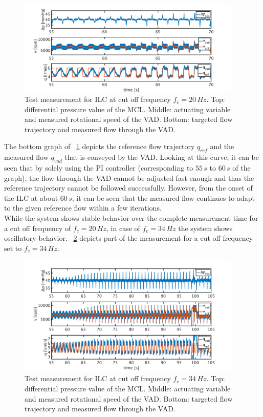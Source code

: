 \begin{figure}[ht]
  \centering
  \includegraphics[width=0.95\textwidth]{images/chapt_5/ILC/pi_to_ilc_fc_20.pdf}
  \caption[Test measurement for ILC at cut off frequency $f_c=20\,Hz$]{Test measurement for ILC at cut off frequency $f_c=20\,Hz$.  Top: differential pressure value of the MCL. Middle: actuating variable and measured rotational speed of the VAD. Bottom: targeted flow trajectory and measured flow through the VAD.}
  \label{fig:pi_to_ilc}
\end{figure}
The bottom graph of \figurename~\ref{fig:pi_to_ilc} depicts the reference flow trajectory $q_{ref}$ and the measured flow $q_{vad}$ that is conveyed by the VAD. Looking at this curve, it can be seen that by solely using the PI controller (corresponding to $55\,s$ to $60\,s$ of the graph), the flow through the VAD cannot be adjusted fast enough and thus the reference trajectory cannot be followed successfully. However, from the onset of the ILC at about $60\,s$, it can be seen that the measured flow continues to adapt to the given reference flow within a few iterations.
\\While the system shows stable behavior over the complete measurement time for a cut off frequency of $f_c=20\,Hz$, in case of $f_c=34\,Hz$ the system shows oscillatory behavior. \figurename~\ref{fig:pi_to_ilc_fc_34} depicts part of the measurement for a cut off frequency set to $f_c=34\,Hz$.
\begin{figure}[ht]
  \centering
  \includegraphics[width=0.95\textwidth]{images/chapt_5/ILC/pi_to_ilc_fc_34.pdf}
  \caption[Test measurement for ILC at cut off frequency $f_c=34\,Hz$]{Test measurement for ILC at cut off frequency $f_c=34\,Hz$. Top: differential pressure value of the MCL. Middle: actuating variable and measured rotational speed of the VAD. Bottom: targeted flow trajectory and measured flow through the VAD.}
  \label{fig:pi_to_ilc_fc_34}
\end{figure}
